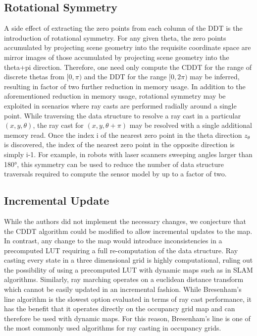 \documentclass[letterpaper, 10 pt, conference]{ieeeconf}  %
\begin{document}
\subsection{Rotational Symmetry}

A side effect of extracting the zero points from each column of the DDT is the introduction of rotational symmetry. For any given theta, the zero points accumulated by projecting scene geometry into the requisite coordinate space are mirror images of those accumulated by projecting scene geometry into the theta+pi direction. Therefore, one need only compute the CDDT for the range of discrete thetas from $[0,\pi)$ and the DDT for the range $[0,2\pi)$ may be inferred, resulting in factor of two further reduction in memory usage.
In addition to the aforementioned reduction in memory usage, rotational symmetry may be exploited in scenarios where ray casts are performed radially around a single point. While traversing the data structure to resolve a ray cast in a particular $(x,y,\theta)$, the ray cast for $(x,y,\theta+\pi)$ may be resolved with a single additional memory read. Once the index i of the nearest zero point in the theta direction $z_{\theta}$ is discovered, the index of the nearest zero point in the opposite direction is simply i-1. For example, in robots with laser scanners sweeping angles larger than 180°, this symmetry can be used to reduce the number of data structure traversals required to compute the sensor model by up to a factor of two.

\subsection{Incremental Update}

While the authors did not implement the necessary changes, we conjecture that the CDDT algorithm could be modified to allow incremental updates to the map. In contrast, any change to the map would introduce inconsistencies in a precomputed LUT requiring a full re-computation of the data structure. Ray casting every state in a three dimensional grid is highly computational, ruling out the possibility of using a precomputed LUT with dynamic maps such as in SLAM algorithms. Similarly, ray marching operates on a euclidean distance transform which cannot be easily updated in an incremental fashion. While Bresenham’s line algorithm is the slowest option evaluated in terms of ray cast performance, it has the benefit that it operates directly on the occupancy grid map and can therefore be used with dynamic maps. For this reason, Bresenham’s line is one of the most commonly used algorithms for ray casting in occupancy grids.
\end{document}
